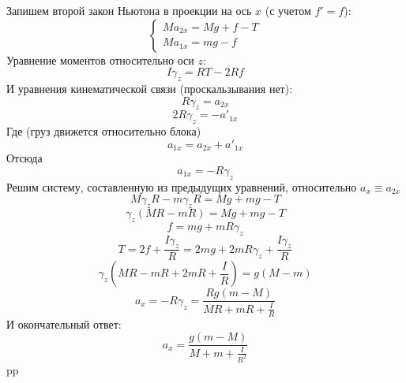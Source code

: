 \documentclass[a5paper,10pt]{article}
\begin{document}
Запишем второй закон Ньютона в проекции на ось $x$ (с учетом $f'=f$):
\begin{equation}
	\left\{\begin{aligned}
		Ma_{2x}=Mg+f-T\\
		Ma_{1x}=mg-f
	\end{aligned}\right.
\end{equation}
Уравнение моментов относительно оси $z$:
\begin{equation}
	I\gamma_z=RT-2Rf
\end{equation}
И уравнения кинематической связи (проскальзывания нет):
\begin{equation}
	R\gamma_z=a_{2x}
\end{equation}
\begin{equation}
	2R\gamma_z=-a'_{1x}
\end{equation}
Где (груз движется относительно блока)
\begin{equation}
	a_{1x}=a_{2x}+a'_{1x}
\end{equation}
Отсюда
\begin{equation}
	a_{1x}=-R\gamma_z
\end{equation}
Решим систему, составленную из предыдущих уравнений, относительно $a_x\equiv a_{2x}$
\begin{equation}
	M\gamma_z R-m\gamma_z R=Mg+mg-T
\end{equation}
\begin{equation}
	\gamma_z(MR-mR)=Mg+mg-T
\end{equation}
\begin{equation}
	f=mg+mR\gamma_z
\end{equation}
\begin{equation}
	T=2f+\frac{I\gamma_z}{R}=2mg+2mR\gamma_z+\frac{I\gamma_z}{R}
\end{equation}
\begin{equation}
	\gamma_z(MR-mR+2mR+\frac{I}{R})=g(M-m)
\end{equation}
\begin{equation}
	a_x=-R\gamma_z=\frac{Rg(m-M)}{MR+mR+\frac{I}{R}}
\end{equation}
И окончательный ответ:
\begin{equation}
	a_x=\frac{g(m-M)}{M+m+\frac{I}{R^2}}
\end{equation}
pp
\end{document}
